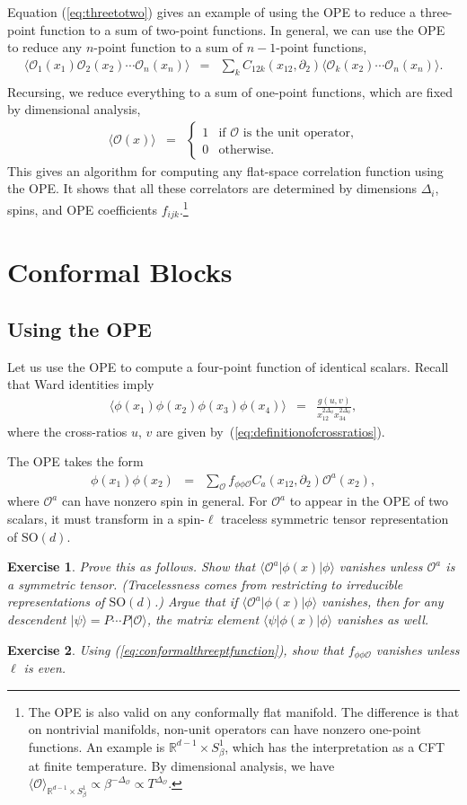 \documentclass{ws-rv9x6}
\newcommand\be{\begin{eqnarray}}
\newcommand\ee{\end{eqnarray}}
\newcommand\f\phi
\newcommand\cO{\mathcal{O}}
\newcommand\ptl\partial
\newcommand\<\langle
\renewcommand\>\rangle
\newcommand\R{\mathbb{R}}
\newcommand\nn{\nonumber}
\renewcommand\.{\cdot}
\newcommand\x\times
\newcommand\SO{\mathrm{SO}}
\newcommand\De{\Delta}
\renewcommand\b\beta
\newtheorem{exercise}{Exercise}[section]
\begin{document}
Equation (\ref{eq:threetotwo}) gives an example of using the OPE to reduce a three-point function to a sum of two-point functions.  In general, we can use the OPE to reduce any $n$-point function to a sum of $n-1$-point functions,
\be
\<\cO_1(x_1)\cO_2(x_2)\cdots\cO_n(x_n)\> &=& \sum_k C_{12k}(x_{12},\ptl_2)\<\cO_k(x_2)\cdots\cO_n(x_n)\>.\nn\\
\ee
Recursing, we reduce everything to a sum of one-point functions, which are fixed by dimensional analysis,
\be
\<\cO(x)\> &=& \begin{cases}
1 & \textrm{if $\cO$ is the unit operator,}\\
0 & \textrm{otherwise.}
\end{cases}
\ee
This gives an algorithm for computing any flat-space correlation function using the OPE\@.  It shows that all these correlators are determined by dimensions $\De_i$, spins, and OPE coefficients $f_{ijk}$.\footnote{The OPE is also valid on any conformally flat manifold.  The difference is that on nontrivial manifolds, non-unit operators can have nonzero one-point functions.  An example is $\R^{d-1}\x S^1_\b$, which has the interpretation as a CFT at finite temperature.  By dimensional analysis, we have $\<\cO\>_{\R^{d-1}\x S^1_\b}\propto \b^{-\De_\cO}\propto T^{\De_\cO}$.\label{foot:finitetemperature}}

\section{Conformal Blocks}

\subsection{Using the OPE}

Let us use the OPE to compute a four-point function of identical scalars.  Recall that Ward identities imply
\be
\<\f(x_1)\f(x_2)\f(x_3)\f(x_4)\> &=& \frac{g(u,v)}{x_{12}^{2\De_\f}x_{34}^{2\De_\f}},
\ee
where the cross-ratios $u$, $v$ are given by~(\ref{eq:definitionofcrossratios}).

The OPE takes the form
\be
\label{eq:scalarscalarOPE}
\f(x_1)\f(x_2) &=& \sum_\cO f_{\f\f\cO} C_{a}(x_{12},\ptl_2)\cO^{a}(x_2),
\ee
where $\cO^{a}$ can have nonzero spin in general.  For $\cO^a$ to appear in the OPE of two scalars, it must transform in a spin-$\ell$ traceless symmetric tensor representation of $\SO(d)$.
\begin{exercise}
Prove this as follows. Show that $\<\cO^a|\f(x)|\f\>$ vanishes unless $\cO^a$ is a symmetric tensor.  (Tracelessness comes from restricting to irreducible representations of $\SO(d)$.) Argue that if $\<\cO^a|\f(x)|\f\>$ vanishes, then for any descendent $|\psi\>=P\cdots P|\cO\>$, the matrix element $\<\psi|\f(x)|\f\>$ vanishes as well.
\end{exercise}
\begin{exercise}
\label{exercise:elleven}
Using (\ref{eq:conformalthreeptfunction}), show that $f_{\f\f\cO}$ vanishes unless $\ell$ is even.
\end{exercise}
\end{document}
